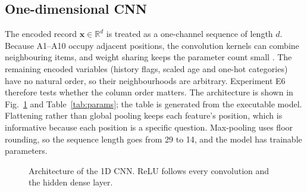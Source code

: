 \documentclass[5p,times,twocolumn]{elsarticle}
\begin{document}
\subsection{One-dimensional CNN}
\label{sec:cnn}

The encoded record $\mathbf{x}\in\mathbb{R}^{d}$ is treated as a one-channel sequence of length $d$. Because A1--A10 occupy adjacent positions, the convolution kernels can combine neighbouring items, and weight sharing keeps the parameter count small \cite{kiranyaz2021}. The remaining encoded variables (history flags, scaled age and one-hot categories) have no natural order, so their neighbourhoods are arbitrary. Experiment E6 therefore tests whether the column order matters. The architecture is shown in Fig.~\ref{fig:cnn} and Table~\ref{tab:params}; the table is generated from the executable model. Flattening rather than global pooling keeps each feature's position, which is informative because each position is a specific question. Max-pooling uses floor rounding, so the sequence length goes from 29 to 14, and the model has \CNNParams{} trainable parameters.



\begin{figure}[t]
\centering
{}
\caption{Architecture of the 1D CNN. ReLU follows every convolution and the hidden dense layer.}
\label{fig:cnn}
\end{figure}
\end{document}
